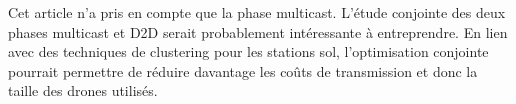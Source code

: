 \begin{frame} {}

Cet article n'a pris en compte que la phase multicast. L'étude conjointe
des deux phases multicast et D2D serait probablement intéressante à entreprendre.
En lien avec des techniques de clustering pour les stations sol, l'optimisation
conjointe pourrait permettre de réduire davantage les coûts de transmission et donc la taille des drones
utilisés.

\end{frame}
